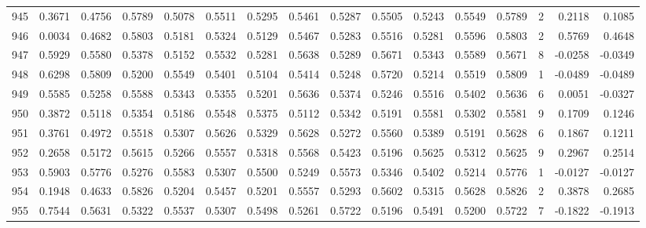 \begin{tabular}{lrrrrrrrrrrrrrrr}
945 &      0.3671 &  0.4756 &  0.5789 &  0.5078 &  0.5511 &  0.5295 &  0.5461 &  0.5287 &  0.5505 &  0.5243 &   0.5549 &     0.5789 &      2 &                    0.2118 &                     0.1085 \\
946 &      0.0034 &  0.4682 &  0.5803 &  0.5181 &  0.5324 &  0.5129 &  0.5467 &  0.5283 &  0.5516 &  0.5281 &   0.5596 &     0.5803 &      2 &                    0.5769 &                     0.4648 \\
947 &      0.5929 &  0.5580 &  0.5378 &  0.5152 &  0.5532 &  0.5281 &  0.5638 &  0.5289 &  0.5671 &  0.5343 &   0.5589 &     0.5671 &      8 &                   -0.0258 &                    -0.0349 \\
948 &      0.6298 &  0.5809 &  0.5200 &  0.5549 &  0.5401 &  0.5104 &  0.5414 &  0.5248 &  0.5720 &  0.5214 &   0.5519 &     0.5809 &      1 &                   -0.0489 &                    -0.0489 \\
949 &      0.5585 &  0.5258 &  0.5588 &  0.5343 &  0.5355 &  0.5201 &  0.5636 &  0.5374 &  0.5246 &  0.5516 &   0.5402 &     0.5636 &      6 &                    0.0051 &                    -0.0327 \\
950 &      0.3872 &  0.5118 &  0.5354 &  0.5186 &  0.5548 &  0.5375 &  0.5112 &  0.5342 &  0.5191 &  0.5581 &   0.5302 &     0.5581 &      9 &                    0.1709 &                     0.1246 \\
951 &      0.3761 &  0.4972 &  0.5518 &  0.5307 &  0.5626 &  0.5329 &  0.5628 &  0.5272 &  0.5560 &  0.5389 &   0.5191 &     0.5628 &      6 &                    0.1867 &                     0.1211 \\
952 &      0.2658 &  0.5172 &  0.5615 &  0.5266 &  0.5557 &  0.5318 &  0.5568 &  0.5423 &  0.5196 &  0.5625 &   0.5312 &     0.5625 &      9 &                    0.2967 &                     0.2514 \\
953 &      0.5903 &  0.5776 &  0.5276 &  0.5583 &  0.5307 &  0.5500 &  0.5249 &  0.5573 &  0.5346 &  0.5402 &   0.5214 &     0.5776 &      1 &                   -0.0127 &                    -0.0127 \\
954 &      0.1948 &  0.4633 &  0.5826 &  0.5204 &  0.5457 &  0.5201 &  0.5557 &  0.5293 &  0.5602 &  0.5315 &   0.5628 &     0.5826 &      2 &                    0.3878 &                     0.2685 \\
955 &      0.7544 &  0.5631 &  0.5322 &  0.5537 &  0.5307 &  0.5498 &  0.5261 &  0.5722 &  0.5196 &  0.5491 &   0.5200 &     0.5722 &      7 &                   -0.1822 &                    -0.1913 \\

\end{tabular}
